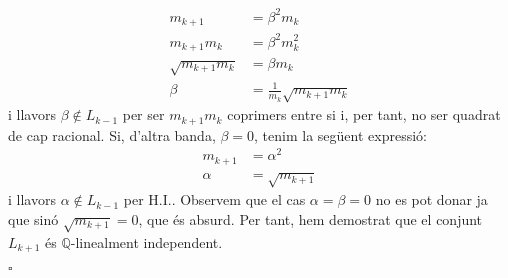 \documentclass[11pt,a4paper]{article}
\newcommand*{\QED}{\hfill\ensuremath{\square}}
\begin{document}
\begin{enumerate}
\begin{enumerate}
        \begin{align*}
            m_{k+1}&=\beta^2m_k \\
            m_{k+1}m_k&=\beta^2m_k^2 \\
            \sqrt{m_{k+1}m_k}&=\beta m_k \\
            \beta &=\frac{1}{m_k}\sqrt{m_{k+1}m_k}
        \end{align*}
        i llavors $\beta \notin L_{k-1}$ per ser $m_{k+1}m_k$ coprimers entre si i, per tant, no ser quadrat de cap racional. Si, d'altra banda, $\beta=0$, tenim la següent expressió:
        \begin{align*}
            m_{k+1}&=\alpha^2 \\
            \alpha &=\sqrt{m_{k+1}}
        \end{align*}
        i llavors $\alpha\notin L_{k-1}$ per H.I.. Observem que el cas $\alpha=\beta =0$ no es pot donar ja que sinó $\sqrt{m_{k+1}}=0$, que és absurd. Per tant, hem demostrat que el conjunt $L_{k+1}$ és $\mathbb{Q}$-linealment independent.\par \QED




\end{enumerate}
\end{enumerate}
\end{document}
